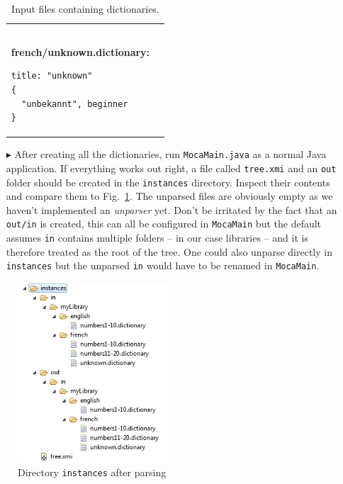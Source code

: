 \begin{enumerate}
\begin{table}
\begin{tabular}{p{6cm} p{6cm} }
\begin{verbatim}
\end{verbatim}
\textbf{french/unknown.dictionary:}
\begin{verbatim}
title: "unknown"
{
  "unbekannt", beginner
}
\end{verbatim}
  \\
\end{tabular}   
\caption{Input files containing dictionaries.}
\label{moca-inputdata}

\end{table}   

\item[$\blacktriangleright$] After creating all the dictionaries, run \texttt{MocaMain.java} as a normal Java application. If everything works out right, a file called \texttt{tree.xmi} and an \texttt{out} folder should be created in the \texttt{instances} directory.  Inspect their contents and compare them to Fig.~\ref{fig:moca-9-ParseResult1}. The unparsed files are obviously empty as we haven't implemented an \emph{unparser} yet.  Don't be irritated by the fact that an \texttt{out/in} is created, this can all be configured in \texttt{MocaMain} but the default assumes \texttt{in} contains multiple folders -- in our case libraries -- and it is therefore treated as the root of the tree.  One could also unparse directly in \texttt{instances} but the unparsed \texttt{in} would have to be renamed in \texttt{MocaMain}.
\end{enumerate}

\clearpage
\begin{figure}[!htbp]
\begin{center}
 \includegraphics[width=0.5\textwidth]{pics/moca/2TextToMocaTree/9-ParseResult1}
  \caption{Directory \texttt{instances} after parsing}
  \label{fig:moca-9-ParseResult1}
\end{center}
\end{figure} 

